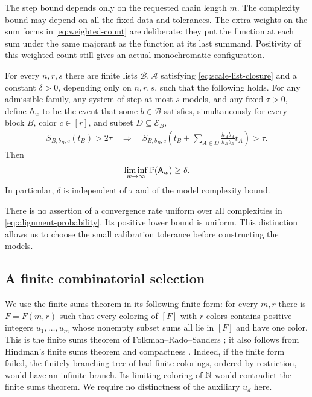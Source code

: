 The step bound depends only on the requested chain length $m$.
The complexity bound may depend on all the fixed data and tolerances.
The extra weights on the sum forms in \eqref{eq:weighted-count} are
deliberate: they put the function at each sum under the same majorant
as the function at its last summand. Positivity of this weighted count
still gives an actual monochromatic configuration.

\begin{principle}[Alignment]\label{pr:alignment}
For every $n,r,s$ there are finite lists $\mathcal B,\mathcal A$
satisfying \eqref{eq:scale-list-closure} and a constant $\delta>0$,
depending only on $n,r,s$, such that the following holds.
For any admissible family, any system of step-at-most-$s$ models, and
any fixed $\tau>0$, define $\mathsf A_w$ to be the event that some
$b\in\mathcal B$ satisfies, simultaneously for every block $B$, color
$c\in[r]$, and subset $D\subseteq\mathcal E_B$,
\begin{equation}\label{eq:alignment-implication}
 \begin{split}
 S_{B,b_B,c}(t_B)>2\tau\quad\Longrightarrow\quad
 S_{B,b_B,c}\left(
 t_B+\sum_{A\in D}\frac{h_Ab_A}{h_Bb_B}t_A\right)>\tau.
 \end{split}
\end{equation}
Then
\begin{equation}\label{eq:alignment-probability}
 \liminf_{w\to\infty}\mathbb P(\mathsf A_w)\ge\delta.
\end{equation}
In particular, $\delta$ is independent of $\tau$ and of the model
complexity bound.
\end{principle}

There is no assertion of a convergence rate uniform over all
complexities in \eqref{eq:alignment-probability}. Its positive lower
bound is uniform. This distinction allows us to choose the small
calibration tolerance before constructing the models.

\subsection{A finite combinatorial selection}

We use the finite sums theorem in its following finite form: for every
$m,r$ there is $F=F(m,r)$ such that every coloring of $[F]$ with $r$
colors contains positive integers $u_1,\ldots,u_m$ whose nonempty subset
sums all lie in $[F]$ and have one color. This is the finite sums theorem
of Folkman--Rado--Sanders \cite[Theorem~2 and Corollary~1.1]{Sanders};
it also follows from Hindman's finite sums theorem and compactness
\cite{Hindman,HindmanStrauss}. Indeed, if the finite form failed,
the finitely branching tree of bad finite colorings, ordered by restriction,
would have an infinite branch. Its limiting coloring of $\mathbb N$ would
contradict the finite sums theorem. We require no distinctness of
the auxiliary $u_d$ here.

